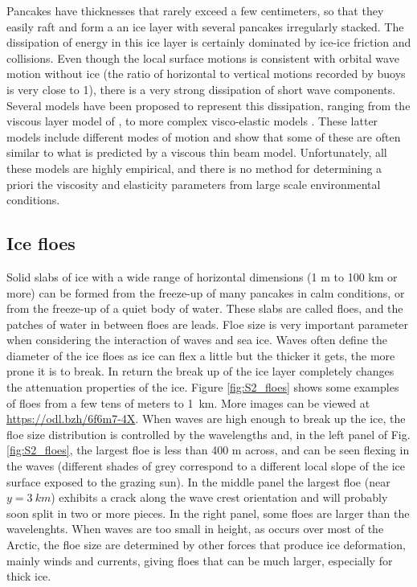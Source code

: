 Pancakes have thicknesses that rarely exceed a few centimeters, so that they easily raft and form a an ice layer with several pancakes irregularly stacked. The dissipation of energy in this ice layer is certainly dominated by ice-ice friction and collisions. Even though the local surface motions is consistent with orbital wave motion without ice (the ratio of horizontal to vertical motions recorded by buoys is very close to 1), there is a very strong dissipation of short wave components. Several models have been proposed to represent this dissipation, ranging from the viscous layer model of \cite{Keller1998}, to more complex visco-elastic models \citep{Wang&Shen2010,Rogers&al.2016}. These latter models include different modes of motion and \cite{Mosig&al.2015} show that some of these are often similar to what is predicted by a viscous thin beam model. Unfortunately, all these models are highly empirical, and there is no method for determining a priori the viscosity and elasticity parameters from large scale environmental conditions.  


\subsection{Ice floes}
Solid slabs of ice with a wide range of horizontal dimensions (1 m to 100 km or more) can be formed from the freeze-up of many pancakes in calm conditions, or from the freeze-up of a quiet body of water. These slabs are called floes, and the patches of water in between floes are leads. Floe size is very important parameter when considering the interaction of waves and sea ice. Waves often define the diameter of the ice floes as ice can flex a little but the thicker it gets, the more prone it is to break. In return the break up of the ice layer completely changes the attenuation properties of the ice. Figure \ref{fig:S2_floes} shows some examples of floes from a few tens of meters to 1~km. More images can be viewed at \url{https://odl.bzh/6f6m7-4X}. When waves are high enough to break up the ice, the floe size distribution is controlled by the wavelengths and, in the left panel of Fig. \ref{fig:S2_floes}, the largest floe is less than 400 m across, and can be seen flexing in the waves (different shades of grey correspond to a different local slope of the ice surface exposed to the grazing sun). In the middle panel the largest floe (near $y=3~km$) exhibits a crack along the wave crest orientation and will probably soon split in two or more pieces. In the right panel, some floes are larger than the wavelenghts. When waves are too small in height, as occurs over most of the Arctic, the floe size are determined by other forces that produce ice deformation, mainly winds and currents, giving floes that can be much larger, especially for thick ice. 



